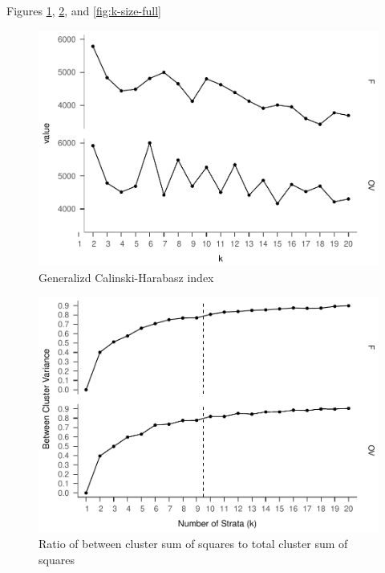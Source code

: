 \documentclass[floatsintext,man]{apa6}
\theoremstyle{definition}
\theoremstyle{definition}
\theoremstyle{definition}
\theoremstyle{remark}
\begin{document}
Figures \ref{fig:ch-full}, \ref{fig:ratio-full}, and
\ref{fig:k-size-full}

\begin{figure}
\centering
\includegraphics{Method_files/figure-latex/ch-full-1.pdf}
\caption{\label{fig:ch-full}Generalizd Calinski-Harabasz index}
\end{figure}

\begin{figure}
\centering
\includegraphics{Method_files/figure-latex/ratio-full-1.pdf}
\caption{\label{fig:ratio-full}Ratio of between cluster sum of squares to
total cluster sum of squares}
\end{figure}
\end{document}
